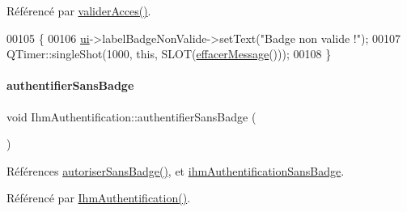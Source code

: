 Référencé par \hyperlink{class_ihm_authentification_ad62f646310fff597d3bf50af2c3d5d0c}{valider\+Acces()}.


\begin{DoxyCode}
00105 \{
00106     \hyperlink{class_ihm_authentification_a2bab782e7f65474f2817c3916ded9d18}{ui}->labelBadgeNonValide->setText(\textcolor{stringliteral}{"Badge non valide !"});
00107     QTimer::singleShot(1000, \textcolor{keyword}{this}, SLOT(\hyperlink{class_ihm_authentification_a67dcacabc50a01245badd2d9268253a4}{effacerMessage}()));
00108 \}
\end{DoxyCode}
\mbox{\label{class_ihm_authentification_af7427fc32a32954401a8792f5672ad19}} 
\paragraph{\texorpdfstring{authentifier\+Sans\+Badge}{authentifierSansBadge}}
{\footnotesize\ttfamily void Ihm\+Authentification\+::authentifier\+Sans\+Badge (\begin{DoxyParamCaption}{ }\end{DoxyParamCaption})\hspace{0.3cm}{\ttfamily [slot]}}



Références \hyperlink{class_ihm_authentification_add8f8e7a0fbf70cef9399ba9f7db7b7e}{autoriser\+Sans\+Badge()}, et \hyperlink{class_ihm_authentification_a9444198403beeaf7386488d56f8ad7f2}{ihm\+Authentification\+Sans\+Badge}.



Référencé par \hyperlink{class_ihm_authentification_a09e60cbdf8d1377e17d940463acb75ba}{Ihm\+Authentification()}.


